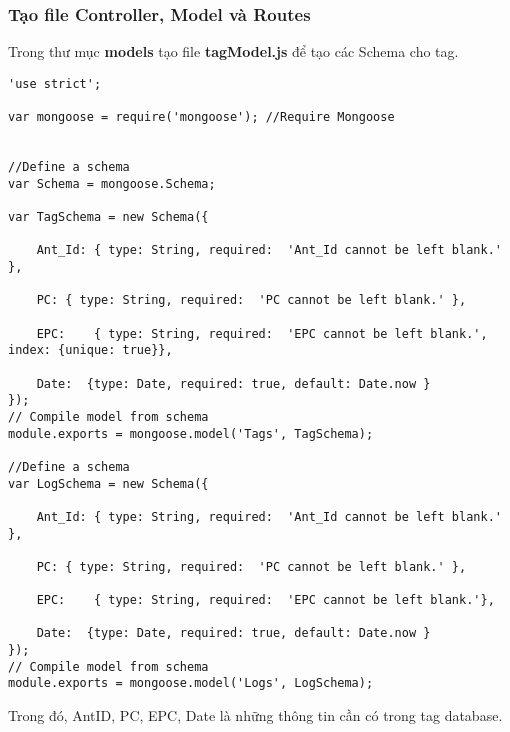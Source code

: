 \subsubsection{Tạo file Controller, Model và Routes}
Trong thư mục \textbf{models} tạo file  \textbf{tagModel.js} để tạo các Schema cho tag.
\begin{lstlisting}
'use strict';

var mongoose = require('mongoose'); //Require Mongoose


//Define a schema
var Schema = mongoose.Schema;
 
var TagSchema = new Schema({

	Ant_Id: { type: String, required:  'Ant_Id cannot be left blank.' },

	PC: { type: String, required:  'PC cannot be left blank.' },
  
	EPC:    { type: String, required:  'EPC cannot be left blank.', index: {unique: true}},

	Date:  {type: Date, required: true, default: Date.now }
});
// Compile model from schema
module.exports = mongoose.model('Tags', TagSchema);

//Define a schema
var LogSchema = new Schema({

	Ant_Id: { type: String, required:  'Ant_Id cannot be left blank.' },

	PC: { type: String, required:  'PC cannot be left blank.' },
  
	EPC:    { type: String, required:  'EPC cannot be left blank.'},

	Date:  {type: Date, required: true, default: Date.now }
});
// Compile model from schema
module.exports = mongoose.model('Logs', LogSchema);
\end{lstlisting}

Trong đó, AntID, PC, EPC, Date là những thông tin cần có trong tag database.\\

